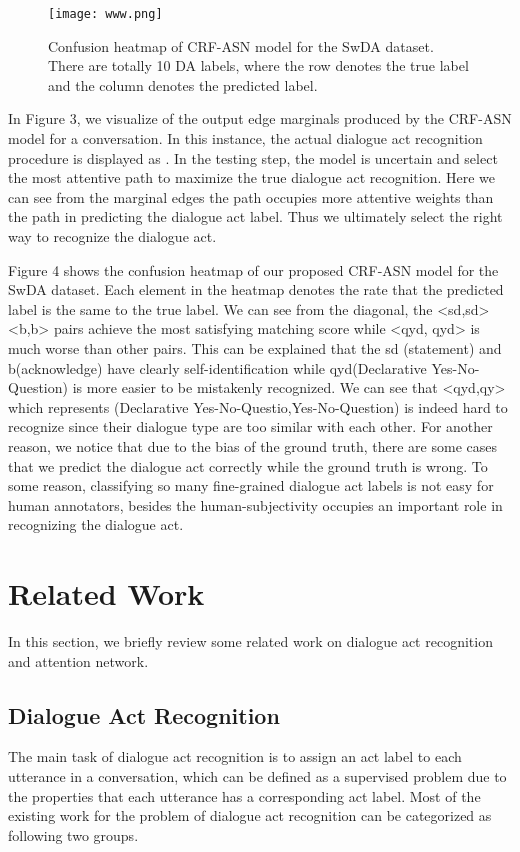 \documentclass[sigconf]{acmart}
\begin{document}
\begin{figure}[t]
	\centering
	\texttt{[image: www.png]}
	\caption{Confusion heatmap of CRF-ASN model for the SwDA dataset. There are totally 10 DA labels, where the row denotes the true label and the column denotes the predicted label.}
\end{figure}

In Figure 3, we visualize of the output edge marginals produced by the CRF-ASN model for a conversation. In this instance, the actual dialogue act recognition procedure is displayed as . In the testing step, the model is uncertain and select the most attentive path to maximize the true dialogue act recognition. Here we can see from the marginal edges the path  occupies more attentive weights than the path   in predicting the dialogue act label. Thus we ultimately select the right way to recognize the dialogue act.

Figure 4 shows the confusion heatmap of our proposed CRF-ASN model for the SwDA dataset. Each element in the heatmap denotes the rate that the predicted label is the same to the true label. We can see from the diagonal, the <sd,sd> <b,b> pairs achieve the most satisfying matching score while <qyd, qyd> is much worse than other pairs. This can be explained that the sd (statement) and b(acknowledge) have clearly self-identification while qyd(Declarative Yes-No-Question) is more easier to be mistakenly recognized. We can see that <qyd,qy> which represents (Declarative Yes-No-Questio,Yes-No-Question) is indeed hard to recognize since their dialogue type are too similar with each other. For another reason, we notice that due to the bias of the ground truth, there are some cases that we predict the dialogue act correctly while the ground truth is wrong. To some reason, classifying so many fine-grained dialogue act labels is not easy for human annotators, besides the human-subjectivity occupies an important role in recognizing the dialogue act.

\section{Related Work}
In this section, we briefly review some related work on dialogue act recognition and attention network. 

\subsection{Dialogue Act Recognition}
The main task of dialogue act recognition is to assign an act label to each utterance in a conversation, which can be defined as a supervised problem due to the properties that each utterance has a corresponding act label. Most of the existing work for the problem of dialogue act recognition can be categorized as following two groups.
\end{document}
